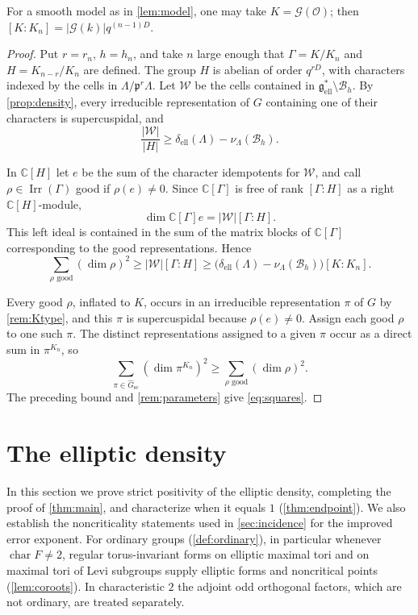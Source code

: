 \documentclass[11pt,reqno]{amsart}
\numberwithin{equation}{section}
\theoremstyle{plain}
\theoremstyle{definition}
\theoremstyle{remark}
\theoremstyle{plain}
\newcommand{\C}{\mathbb{C}}      %
\newcommand{\OO}{\mathcal{O}}    %
\newcommand{\pp}{\mathfrak{p}}   %
\newcommand{\Lat}{\mathcal{L}}   %
\newcommand{\dLat}{\Lambda}      %
\newcommand{\g}{\mathfrak{g}}    %
\newcommand{\gd}{\mathfrak{g}^*} %
\newcommand{\Ell}[2][]{#2_{#1\mathrm{ell}}}   %
\newcommand{\elld}[2][]{\delta_{\mathrm{ell}}^{#1}(#2)}  %
\newcommand{\Bad}{\mathcal{B}}   %
\newcommand{\Gsc}{\widehat{G}_{\mathrm{sc}}}    %
\newcommand{\cG}{\mathcal{G}}                   %
\newcommand{\abs}[1]{\lvert#1\rvert}
\DeclareMathOperator{\chr}{char}   %
\DeclareMathOperator{\Irr}{Irr}
\newcommand{\ordinary}{ordinary}
\begin{document}
For a smooth model as in \cref{lem:model}, one may take $K=\cG(\OO)$; then $[K:K_n]=\abs{\cG(k)}q^{(n-1)D}$.

\begin{proof}
Put $r=r_n$, $h=h_n$, and take $n$ large enough that
$\Gamma=K/K_n$ and $H=K_{n-r}/K_n$ are defined. The group $H$ is
abelian of order $q^{rD}$, with characters indexed by the cells in
$\dLat/\pp^r\dLat$. Let $\mathcal W$ be the cells contained in
$\Ell{\gd}\setminus\Bad_h$. By \cref{prop:density}, every irreducible
representation of $G$ containing one of their characters is
supercuspidal, and
\[
\frac{|\mathcal W|}{|H|}
\ge\elld{\dLat}-\nu_{\dLat}(\Bad_h).
\]

In $\C[H]$ let $e$ be the sum of the character idempotents for
$\mathcal W$, and call $\rho\in\Irr(\Gamma)$ good if $\rho(e)\ne0$.
Since $\C[\Gamma]$ is free of rank $[\Gamma:H]$ as a right
$\C[H]$-module,
\[
\dim\C[\Gamma]e=|\mathcal W|[\Gamma:H].
\]
This left ideal is contained in the sum of the matrix blocks of
$\C[\Gamma]$ corresponding to the good representations. Hence
\[
\sum_{\rho\text{ good}}(\dim\rho)^2
\ge|\mathcal W|[\Gamma:H]
\ge\bigl(\elld{\dLat}-\nu_{\dLat}(\Bad_h)\bigr)[K:K_n].
\]

Every good $\rho$, inflated to $K$, occurs in an irreducible
representation $\pi$ of $G$ by \cref{rem:Ktype}, and this $\pi$ is
supercuspidal because $\rho(e)\ne0$. Assign each good $\rho$ to one
such $\pi$. The distinct representations assigned to a given $\pi$
occur as a direct sum in $\pi^{K_n}$, so
\[
\sum_{\pi\in\Gsc}(\dim\pi^{K_n})^2
\ge\sum_{\rho\text{ good}}(\dim\rho)^2.
\]
The preceding bound and \cref{rem:parameters} give \eqref{eq:squares}.
\end{proof}

\section{The elliptic density}\label{sec:positivity}

In this section we prove strict positivity of the elliptic density,
completing the proof of \cref{thm:main}, and characterize when it equals
$1$ (\cref{thm:endpoint}).
We also establish the noncriticality statements used in \cref{sec:incidence} for the improved error exponent.
For \ordinary{} groups (\cref{def:ordinary}), in
particular whenever $\chr F\ne2$, regular torus-invariant forms
on elliptic maximal tori and on maximal tori of Levi subgroups supply
elliptic forms and noncritical points (\cref{lem:coroots}). In
characteristic $2$ the adjoint odd orthogonal factors, which are not
\ordinary{}, are treated separately.
\end{document}
